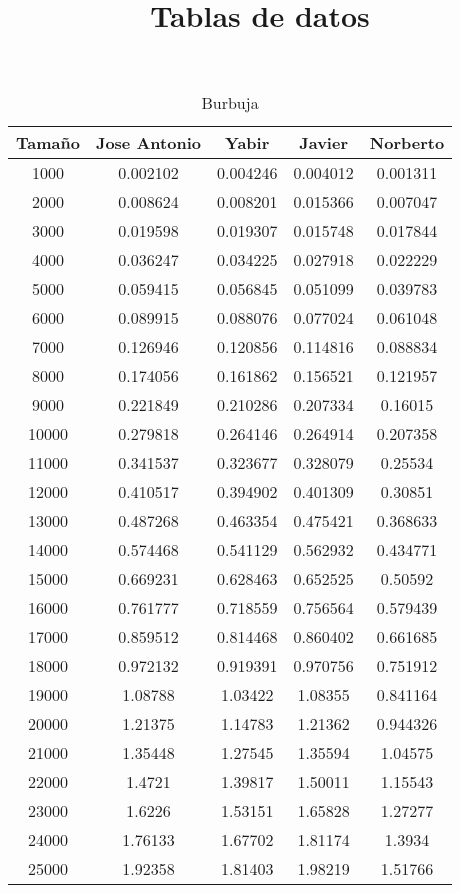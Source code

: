 \documentclass{article}
\title{Tablas de datos}
\begin{document}

\maketitle

\begin{table}[h]
\centering
\caption{Burbuja}
\begin{tabular}{ | c | c  | c | c | c | }
  \hline
   Tama\~no & Jose Antonio & Yabir & Javier & Norberto\\ 
   \hline
1000	&	0.002102	&	0.004246	&	0.004012	&	0.001311	\\
2000	&	0.008624	&	0.008201	&	0.015366	&	0.007047	\\
3000	&	0.019598	&	0.019307	&	0.015748	&	0.017844	\\
4000	&	0.036247	&	0.034225	&	0.027918	&	0.022229	\\
5000	&	0.059415	&	0.056845	&	0.051099	&	0.039783	\\
6000	&	0.089915	&	0.088076	&	0.077024	&	0.061048	\\
7000	&	0.126946	&	0.120856	&	0.114816	&	0.088834	\\
8000	&	0.174056	&	0.161862	&	0.156521	&	0.121957	\\
9000	&	0.221849	&	0.210286	&	0.207334	&	0.16015	\\
10000	&	0.279818	&	0.264146	&	0.264914	&	0.207358	\\
11000	&	0.341537	&	0.323677	&	0.328079	&	0.25534	\\
12000	&	0.410517	&	0.394902	&	0.401309	&	0.30851	\\
13000	&	0.487268	&	0.463354	&	0.475421	&	0.368633	\\
14000	&	0.574468	&	0.541129	&	0.562932	&	0.434771	\\
15000	&	0.669231	&	0.628463	&	0.652525	&	0.50592	\\
16000	&	0.761777	&	0.718559	&	0.756564	&	0.579439	\\
17000	&	0.859512	&	0.814468	&	0.860402	&	0.661685	\\
18000	&	0.972132	&	0.919391	&	0.970756	&	0.751912	\\
19000	&	1.08788	&	1.03422	&	1.08355	&	0.841164	\\
20000	&	1.21375	&	1.14783	&	1.21362	&	0.944326	\\
21000	&	1.35448	&	1.27545	&	1.35594	&	1.04575	\\
22000	&	1.4721	&	1.39817	&	1.50011	&	1.15543	\\
23000	&	1.6226	&	1.53151	&	1.65828	&	1.27277	\\
24000	&	1.76133	&	1.67702	&	1.81174	&	1.3934	\\
25000	&	1.92358	&	1.81403	&	1.98219	&	1.51766	\\
  \hline
 \end{tabular}
\end{table}
\end{document}
